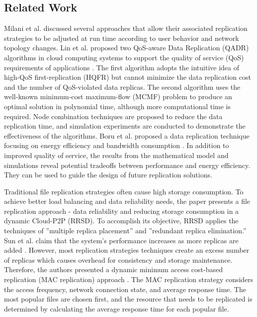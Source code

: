\documentclass[10pt, conference]{IEEEtran}
\begin{document}
\subsection{Related Work}
Milani et al. \cite{ALAMIMILANI2016229} discussed several approaches that allow their associated replication strategies to be adjusted at run time according to user behavior and network topology changes. Lin et al. proposed two QoS-aware Data Replication (QADR) algorithms in cloud computing systems to support the quality of service (QoS) requirements of applications \cite{lin_dynamic}. The first algorithm adopts the intuitive idea of high-QoS first-replication (HQFR) but cannot minimize the data replication cost and the number of QoS-violated data replicas. The second algorithm uses the well-known minimum-cost maximum-flow (MCMF) problem to produce an optimal solution in polynomial time, although more computational time is required. Node combination techniques are proposed to reduce the data replication time, and simulation experiments are conducted to demonstrate the effectiveness of the algorithms. Boru et al. proposed a data replication technique focusing on energy efficiency and bandwidth consumption \cite{boru_energy}. In addition to improved quality of service, the results from the mathematical model and simulations reveal potential tradeoffs between performance and energy efficiency. They can be used to guide the design of future replication solutions.

Traditional file replication strategies often cause high storage consumption. To achieve better load balancing and data reliability needs, the paper \cite{sun_2019_rrsd} presents a file replication approach - data reliability and reducing storage consumption in a dynamic Cloud-P2P (RRSD). To accomplish its objective, RRSD applies the techniques of ”multiple replica placement” and ”redundant replica elimination.” Sun et al. claim that the system’s performance increases as more replicas are added \cite{sun_2009_dynamic}. However, most replication strategies techniques create an excess number of replicas which causes overhead for consistency and storage maintenance. Therefore, the authors presented a dynamic minimum access cost-based replication (MAC replication) approach \cite{sun_2009_dynamic}. The MAC replication strategy considers the access frequency, network connection state, and average response time. The most popular files are chosen first, and the resource that needs to be replicated is determined by calculating the average response time for each popular file.
\end{document}
